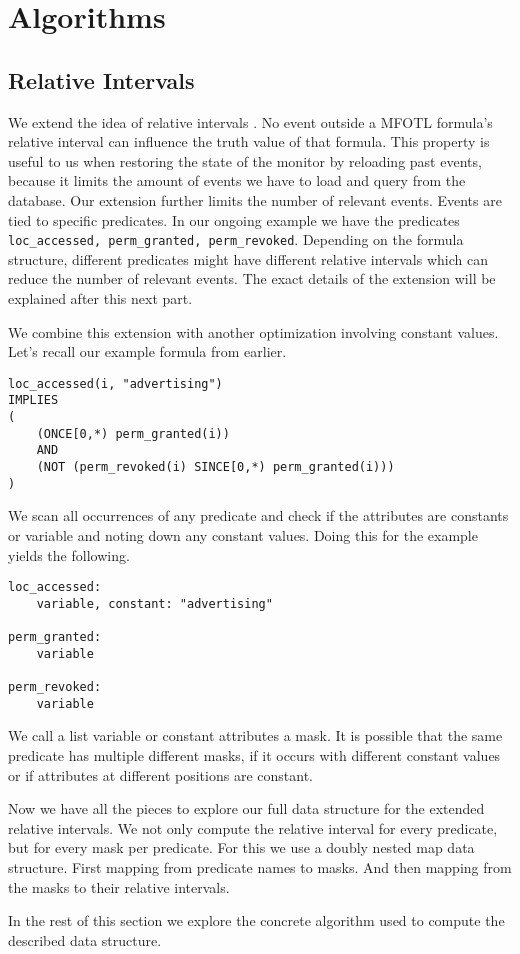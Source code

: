 \section{Algorithms}


\subsection{Relative Intervals}
We extend the idea of relative intervals \cite{Basin2016}.
No event outside a MFOTL formula's relative interval can influence the truth value of that formula.
This property is useful to us when restoring the state of the monitor by reloading past events, because it limits the amount of events we have to load and query from the database.
Our extension further limits the number of relevant events.
Events are tied to specific predicates.
In our ongoing example we have the predicates \texttt{loc\_accessed, perm\_granted, perm\_revoked}.
Depending on the formula structure, different predicates might have different relative intervals which can reduce the number of relevant events.
The exact details of the extension will be explained after this next part.

We combine this extension with another optimization involving constant values.
Let's recall our example formula from earlier.

\begin{verbatim}
loc_accessed(i, "advertising") 
IMPLIES 
(
    (ONCE[0,*) perm_granted(i)) 
    AND 
    (NOT (perm_revoked(i) SINCE[0,*) perm_granted(i)))
)
\end{verbatim}

We scan all occurrences of any predicate and check if the attributes are constants or variable and noting down any constant values.
Doing this for the example yields the following.

\begin{verbatim}
loc_accessed:
    variable, constant: "advertising"

perm_granted:
    variable

perm_revoked:
    variable
\end{verbatim}

We call a list variable or constant attributes a mask.
It is possible that the same predicate has multiple different masks, if it occurs with different constant values or if attributes at different positions are constant.

Now we have all the pieces to explore our full data structure for the extended relative intervals.
We not only compute the relative interval for every predicate, but for every mask per predicate.
For this we use a doubly nested map data structure.
First mapping from predicate names to masks.
And then mapping from the masks to their relative intervals.

In the rest of this section we explore the concrete algorithm used to compute the described data structure.




\subsection{}


